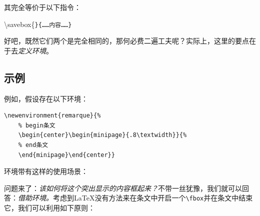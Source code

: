 其完全等价于以下指令：

\begin{dmd}
\backslash savebox\{\verb|}{……内容……}|
\end{dmd}

好吧，既然它们两个是完全相同的，那何必费二遍工夫呢？实际上，这里的要点在于去\emph{定义环境}。

\subsection{示例}

例如，假设存在以下环境：

\begin{dmd}
\begin{verbatim}
\newenvironment{remarque}{%
    % begin条文 
    \begin{center}\begin{minipage}{.8\textwidth}}{% 
    % end条文
    \end{minipage}\end{center}}\end{verbatim}
\end{dmd}

环境带有这样的使用场景：

\newenvironment{remarque}{%
    \begin{center}\begin{minipage}{.8\textwidth}}{%
    \end{minipage}\end{center}}


问题来了：\emph{该如何将这个突出显示的内容框起来？}不带一丝犹豫，我们就可以回答：\emph{借助环境}\emph{。}考虑到\LaTeX 没有方法来在条文中开启一个\verb|\fbox|并在条文中结束它，我们可以利用如下原则：

